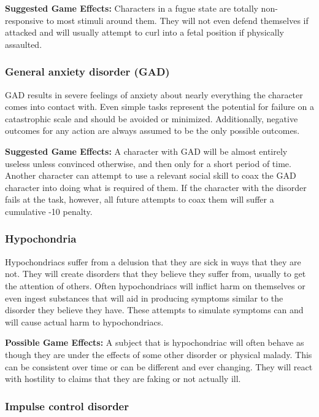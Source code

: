 \textbf{Suggested Game Effects:} Characters in a fugue state are totally non-responsive to most stimuli around them. They will not even defend themselves if attacked and will usually attempt to curl into a fetal position if physically assaulted. 

\subsubsection{General anxiety disorder (GAD)} 

GAD results in severe feelings of anxiety about nearly everything the character comes into contact with. Even simple tasks represent the potential for failure on a catastrophic scale and should be avoided or minimized. Additionally, negative outcomes for any action are always assumed to be the only possible outcomes. 

\textbf{Suggested Game Effects:} A character with GAD will be almost entirely useless unless convinced otherwise, and then only for a short period of time. Another character can attempt to use a relevant social skill to coax the GAD character into doing what is required of them. If the character with the disorder fails at the task, however, all future attempts to coax them will suffer a cumulative -10 penalty. 

\subsubsection{Hypochondria} 

Hypochondriacs suffer from a delusion that they are sick in ways that they are not. They will create disorders that they believe they suffer from, usually to get the attention of others. Often hypochondriacs will inflict harm on themselves or even ingest substances that will aid in producing symptoms similar to the disorder they believe they have. These attempts to simulate symptoms can and will cause actual harm to hypochondriacs. 

\textbf{Possible Game Effects:} A subject that is hypochondriac will often behave as though they are under the effects of some other disorder or physical malady. This can be consistent over time or can be different and ever changing. They will react with hostility to claims that they are faking or not actually ill. 

\subsubsection{Impulse control disorder} 

